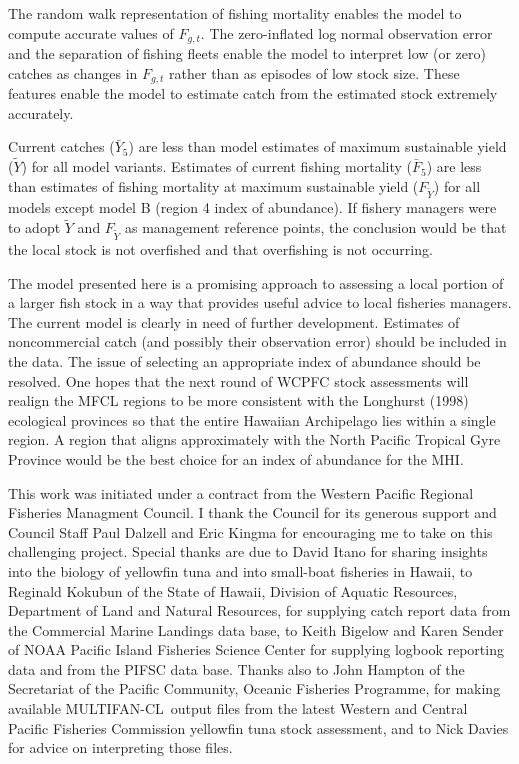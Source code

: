 \documentclass[12pt,letterpaper]{article}
\newcommand\singlespacing{\baselineskip=1.0\normalbaselineskip}
\newcommand\MFCL{MULTIFAN-CL}
\newcommand\MSY{\widetilde{Y}}
\newcommand\Fmsy{F_{\MSY}}
\begin{document}
The random walk representation of fishing mortality enables
the model to compute accurate values of $F_{g,t}$. The zero-inflated
log normal observation error and the separation of fishing fleets
enable the model to interpret low (or zero) catches as changes in
$F_{g,t}$ rather than as episodes of low stock size.
These features enable the model to estimate catch
from the estimated stock extremely accurately.

Current catches ($\bar{Y}_5$) are less than model estimates of maximum
sustainable yield ($\MSY$) for all model variants. 
Estimates of current fishing mortality ($\bar{F}_5$) are less than
estimates of fishing mortality at maximum sustainable yield ($\Fmsy$)
for all models except model B (region 4 index of abundance).
If fishery managers were to adopt $\MSY$ and $\Fmsy$ as management
reference points, the conclusion would be that the local stock is not
overfished and that overfishing is not occurring.

The model presented here is a promising approach to assessing a local
portion of a larger fish stock in a way that provides useful advice to
local fisheries managers. The current model is clearly in need of
further development. Estimates of noncommercial catch (and possibly
their observation error) should be included in the data. 
The issue of selecting an appropriate index of abundance should be
resolved. One hopes that the
next round of  WCPFC stock assessments will realign
the MFCL regions to be more consistent
with the Longhurst (1998) ecological provinces so that the entire
Hawaiian Archipelago lies within a single region. 
A region that aligns approximately with  the North Pacific Tropical
Gyre Province would be the best choice for an index of abundance for
the MHI.



\clearpage
\singlespacing
{}
This work was initiated under a contract from the Western Pacific
Regional Fisheries Managment Council. 
I thank the Council for its generous support and
Council Staff Paul Dalzell and Eric Kingma for encouraging me to
take on this challenging project.
Special thanks are due 
to David Itano for sharing insights into the biology of yellowfin tuna
and into small-boat fisheries in Hawaii,
to Reginald Kokubun of the State of Hawaii, Division of Aquatic Resources,
Department of Land and Natural Resources, for supplying catch report
data from the Commercial Marine Landings data base,
to Keith Bigelow and Karen Sender of NOAA Pacific
Island Fisheries Science Center for supplying logbook reporting data and
from the PIFSC data base.
Thanks also to John Hampton of the Secretariat of the Pacific
Community, Oceanic Fisheries Programme, for making available \MFCL\
output files from the latest Western and Central Pacific
Fisheries Commission yellowfin tuna stock assessment, and to Nick
Davies for advice on interpreting those files.
\end{document}
